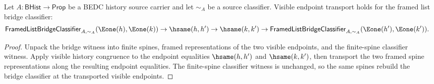 \begin{theorem}
\label{thm:list-spine-bridge-visible-endpoint-transport}
Let $A:\mathsf{BHist}\to\mathsf{Prop}$ be a BEDC history source carrier and let
$\sim_A$ be a source classifier. Visible endpoint transport holds for the framed
list bridge classifier:
$$
\mathsf{FramedListBridgeClassifier}_{A,\sim_A}(\Eone(h),\Eone(k))
\to \hsame(h,h')\to \hsame(k,k')\to
\mathsf{FramedListBridgeClassifier}_{A,\sim_A}(\Eone(h'),\Eone(k')).
$$
\end{theorem}
\begin{proof}
Unpack the bridge witness into finite spines, framed representations of the two
visible endpoints, and the finite-spine classifier witness. Apply visible
history congruence to the endpoint equalities $\hsame(h,h')$ and
$\hsame(k,k')$, then transport the two framed spine representations along the
resulting endpoint equalities. The finite-spine classifier witness is unchanged,
so the same spines rebuild the bridge classifier at the transported visible
endpoints.
\end{proof}
